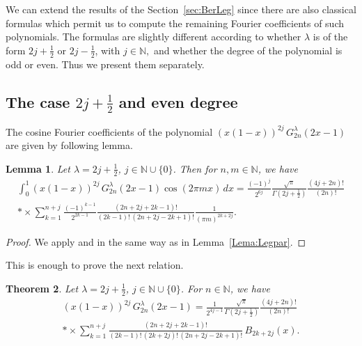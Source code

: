 \documentclass[a4paper,reqno]{amsart}
\newcommand{\N}{\mathbb{N}}
\theoremstyle{plain}
\newtheorem{Teor}{Theorem}[section]
\newtheorem{Lema}[Teor]{Lemma}
\numberwithin{equation}{section}
\theoremstyle{remark}
\begin{document}
We can extend the results of the Section~\ref{sec:BerLeg} since there are also classical formulas which permit us to compute the remaining Fourier coefficients of such polynomials. The formulas are slightly different according to whether $\lambda$ is of the form $2j+ \frac{1}{2}$ or $2j-\frac{1}{2}$, with $j\in\N,$ and whether the degree of the polynomial is odd or even. Thus we present them separately.

\subsection{The case $2j+\frac{1}{2}$ and even degree}

The cosine Fourier coefficients of the polynomial $(x(1-x))^{2j}\,G_{2n}^\lambda (2x-1)$ are given by following lemma.

\begin{Lema} 
Let $\lambda = 2j+ \frac{1}{2}$, $j\in \N\cup\{0\}$. Then for $n,m\in\N$, we have
\begin{multline*}
  \int_0^1 (x(1-x))^{2j}\,G_{2n}^\lambda (2x-1) \cos(2\pi mx)\,dx
  = \frac{(-1)^j}{2^{6j}} \frac{\sqrt{\pi}}{\Gamma(2j+ \frac{1}{2})} \frac{(4j+2n)!}{(2n)!}
  \\*
  \times
  \sum_{k=1}^{n+j} \frac{(-1)^{k-1}}{2^{2k-1}} \frac{(2n+2j+2k-1)!}{(2k-1)!\,(2n+2j-2k+1)!} 
  \frac{1}{(\pi m)^{2k+2j}}.
\end{multline*}
\end{Lema}

\begin{proof}
We apply \cite[formula 2.21.7-1, p.~534]{PBM} and \cite[formula 10.1.8, p.~437]{AS} in the same way as in Lemma~\ref{Lema:Legpar}.
\end{proof}

This is enough to prove the next relation.

\begin{Teor} 
\label{Teor:gegen2j+par}
Let $\lambda = 2j+ \frac{1}{2}$, $j\in \N\cup\{0\}$. For $n\in\N$, we have
\begin{multline}
\label{gegen2j+par}
  (x(1-x))^{2j}\,G_{2n}^\lambda(2x-1)
  = \frac{1}{2^{4j-1}} \frac{\sqrt{\pi}}{\Gamma(2j+ \frac{1}{2})} \frac{(4j+2n)!}{(2n)!}
  \\*
  \times
  \sum_{k=1}^{n+j} \frac{(2n+2j+2k-1)!}{(2k-1)!\,(2k+2j)!\,(2n+2j-2k+1)!}\,B_{2k+2j}(x).
\end{multline}
\end{Teor}
\end{document}
